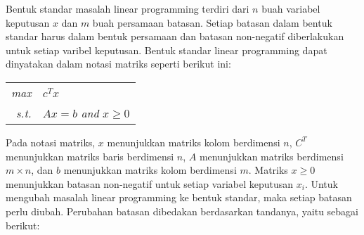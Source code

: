 Bentuk standar masalah linear programming terdiri dari $n$ buah variabel keputusan $x$ dan $m$ buah persamaan batasan. Setiap batasan dalam bentuk standar harus dalam bentuk persamaan dan batasan non-negatif diberlakukan untuk setiap varibel keputusan. Bentuk standar linear programming dapat dinyatakan dalam notasi matriks seperti berikut ini:
        
\begin{center}
	\begin{tabular}{r l}
    	\textit{max}   & $c^Tx$ \\
        \textit{s.t.} & $Ax=b$ \textit{and} $x\geq0$
	\end{tabular}    
\end{center}
        
Pada notasi matriks, $x$ menunjukkan matriks kolom berdimensi $n$, $C^T$ menunjukkan matriks baris berdimensi $n$, $A$ menunjukkan matriks berdimensi $m\times n$, dan $b$ menunjukkan matriks kolom berdimensi $m$. Matriks $x\geq0$ menunjukkan batasan non-negatif untuk setiap variabel keputusan $x_i$. Untuk mengubah masalah linear programming ke bentuk standar, maka setiap batasan perlu diubah. Perubahan batasan dibedakan berdasarkan tandanya, yaitu sebagai berikut:
		
